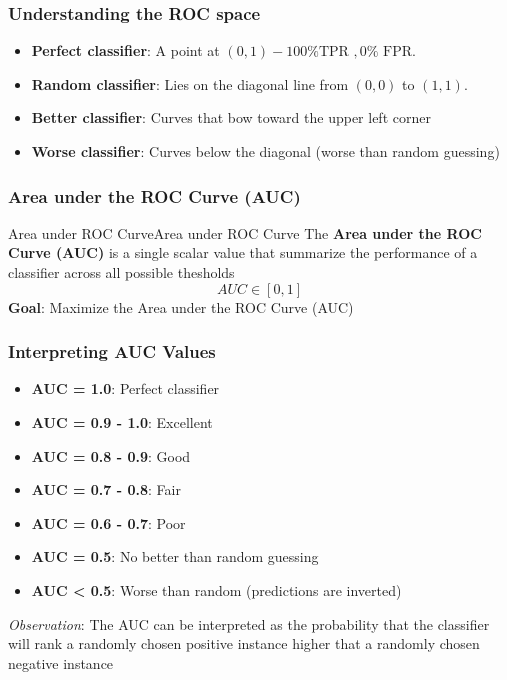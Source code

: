 \documentclass[a4paper]{article}
\theoremstyle{definition}
\begin{document}
\subsubsection{Understanding the ROC space}
\begin{itemize}
    \item \textbf{Perfect classifier}: A point at \( (0,1) - 100\% \text{TPR }, 0\% \text{ FPR} \).
    \item \textbf{Random classifier}: Lies on the diagonal line from \( (0,0) \) to \( (1,1) \).
    \item \textbf{Better classifier}: Curves that bow toward the upper left corner 
    \item \textbf{Worse classifier}: Curves below the diagonal (worse than random guessing)
\end{itemize}
\subsubsection{Area under the ROC Curve (AUC)}
\begin{definition}{Area under ROC Curve}{Area under ROC Curve}
The \textbf{Area under the ROC Curve (AUC)} is a single scalar value that 
summarize the performance of a classifier across all possible thesholds
\[
  AUC \in [0,1]
\]
\textbf{Goal}: Maximize the Area under the ROC Curve (AUC)
\end{definition}
\subsubsection{Interpreting AUC Values}
\begin{itemize}
    \item \textbf{AUC = 1.0}: Perfect classifier 
    \item \textbf{AUC = 0.9 - 1.0}: Excellent
    \item \textbf{AUC = 0.8 - 0.9}: Good 
    \item \textbf{AUC = 0.7 - 0.8}: Fair
    \item \textbf{AUC = 0.6 - 0.7}: Poor
    \item \textbf{AUC = 0.5}: No better than random guessing 
    \item \textbf{AUC < 0.5}: Worse than random (predictions are inverted)
\end{itemize}
\textit{Observation}: The AUC can be interpreted as the probability that the classifier will rank a randomly chosen positive instance higher that a randomly
chosen negative instance
\end{document}
